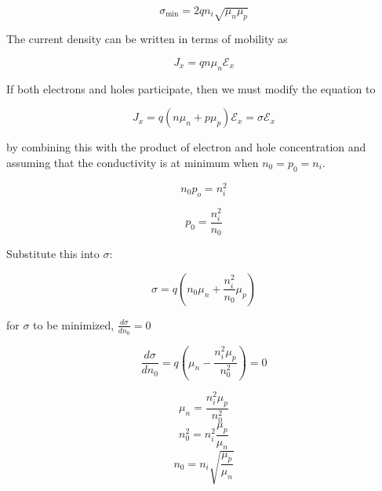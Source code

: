 \begin{equation*}
    \sigma_{\min }=2 q n_{i} \sqrt{\mu_{n} \mu_{p}}
\end{equation*}

The current density can be written in terms of mobility as

\begin{equation*}
    J_{x}=q n \mu_{n} \mathscr{E}_{x} 
\end{equation*}

If both electrons and holes participate, then we must modify the equation to

\begin{equation*}
    J_{x}=q\left(n \mu_{n}+p \mu_{p}\right) \mathscr{E}_{x}=\sigma \mathscr{E}_{x}
\end{equation*}

by combining this with the product of electron and hole concentration and assuming that the conductivity is at minimum when $n_0=p_0=n_i$.

\begin{equation*}
    n_0 p_o=n^2_i
\end{equation*}

\begin{equation*}
    p_0 = \frac{n_i^2}{n_0}
\end{equation*}

Substitute this into $ \sigma $:

\begin{equation*}
    \sigma = q(n_0 \mu_n + \frac{n_i^2}{n_0} \mu_p)
\end{equation*}

for $\sigma$ to be minimized, $\frac{d\sigma}{dn_0}=0$

\begin{equation*}
    \frac{d\sigma}{dn_0} = q(\mu_n - \frac{n_i^2 \mu_p}{n_0^2})=0
\end{equation*}

\begin{equation*}
    \mu_n = \frac{n_i^2 \mu_p}{n_0^2}
\end{equation*}
\begin{equation*}
    n_0^2 = n_i^2 \frac{\mu_p}{\mu_n}
\end{equation*}
\begin{equation*}
    n_0 = n_i \sqrt{\frac{\mu_p}{\mu_n}}
\end{equation*}

